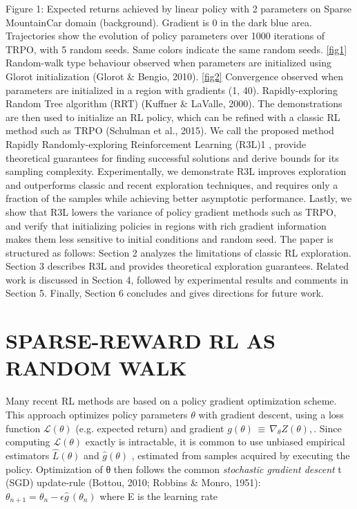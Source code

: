 \documentclass{article}
\newcounter{n}
\begin{document}
Figure 1: Expected returns achieved by linear policy with 2 parameters on Sparse MountainCar
domain (background). Gradient is 0 in the dark blue area. Trajectories show the evolution of policy
parameters over 1000 iterations of TRPO, with 5 random seeds. Same colors indicate the same
random seeds. \ref{fig1} Random-walk type behaviour observed when parameters are initialized using
Glorot initialization (Glorot \& Bengio, 2010). \ref{fig2} Convergence observed when parameters are
initialized in a region with gradients (1, 40).
Rapidly-exploring Random Tree algorithm (RRT) (Kuffner & LaValle, 2000). The demonstrations
are then used to initialize an RL policy, which can be refined with a classic RL method such
as TRPO (Schulman et al., 2015). We call the proposed method Rapidly Randomly-exploring
Reinforcement Learning (R3L)1
, provide theoretical guarantees for finding successful solutions
and derive bounds for its sampling complexity. Experimentally, we demonstrate R3L improves
exploration and outperforms classic and recent exploration techniques, and requires only a fraction of
the samples while achieving better asymptotic performance. Lastly, we show that R3L lowers the
variance of policy gradient methods such as TRPO, and verify that initializing policies in regions
with rich gradient information makes them less sensitive to initial conditions and random seed.
The paper is structured as follows: Section 2 analyzes the limitations of classic RL exploration.
Section 3 describes R3L and provides theoretical exploration guarantees. Related work is discussed in
Section 4, followed by experimental results and comments in Section 5. Finally, Section 6 concludes
and gives directions for future work.

\section{ SPARSE-REWARD RL AS RANDOM WALK}
Many recent RL methods are based on a policy gradient optimization scheme. This approach
optimizes policy parameters $\theta$ with gradient descent, using a loss function ${\mathcal{L}}(\theta)$  (e.g. expected return)
and gradient $g(\theta)\,\equiv\,\nabla_{\theta}Z(\theta), $. Since computing  ${\mathcal{L}}(\theta)$ exactly is intractable, it is common to use
unbiased empirical estimators ${\hat{L}}(\theta) $  and ${\hat{g}}(\theta) $ , estimated from samples acquired by executing the policy.
Optimization of θ then follows the common \textit{stochastic gradient descent} t (SGD) update-rule (Bottou,
2010; Robbins \& Monro, 1951): 
$
\theta_{n+1}=\theta_{n}-\epsilon{\hat{g}}\,(\theta_{n}) 
$ where E is the learning rate
\end{document}

